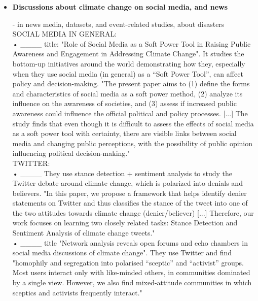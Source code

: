 \begin{itemize}



\item \textbf{Discussions about climate change on social media, and news}

- in news media, datasets, and event-related studies, about disasters\\

SOCIAL MEDIA IN GENERAL:\\

• ____ title: "Role of Social Media as a Soft Power Tool in Raising Public Awareness and Engagement in Addressing Climate Change". It studies the bottom-up initiatives around the world demonstrating how they, especially when they use social media (in general) as a “Soft Power Tool”, can affect policy and decision-making. "The present paper aims to (1) define the forms and characteristics of social media as a soft power method, (2) analyze its influence on the awareness of societies, and (3) assess if increased public awareness could influence the official political and policy processes. [...] The study finds that even though it is difficult to assess the effects of social media as a soft power tool with certainty, there are visible links between social media and changing public perceptions, with the possibility of public opinion influencing political decision-making."\\

TWITTER:\\


• ____ They use stance detection + sentiment analysis to study the Twitter debate around climate change, which is polarized into denials and believers. "In this paper, we propose a framework that helps identify denier statements on Twitter and thus classifies the stance of the tweet into one of the two attitudes towards climate change (denier/believer) [...] Therefore, our work focuses on learning two closely related tasks: Stance Detection and Sentiment Analysis of climate change tweets." \\

• ____ title "Network analysis reveals open forums and echo chambers in social media discussions of climate change". They use Twitter and find "homophily and segregation into polarised “sceptic” and “activist” groups. Most users interact only with like-minded others, in communities dominated by a single view. However, we also find mixed-attitude communities in which sceptics and activists frequently interact."\\


\end{itemize}
